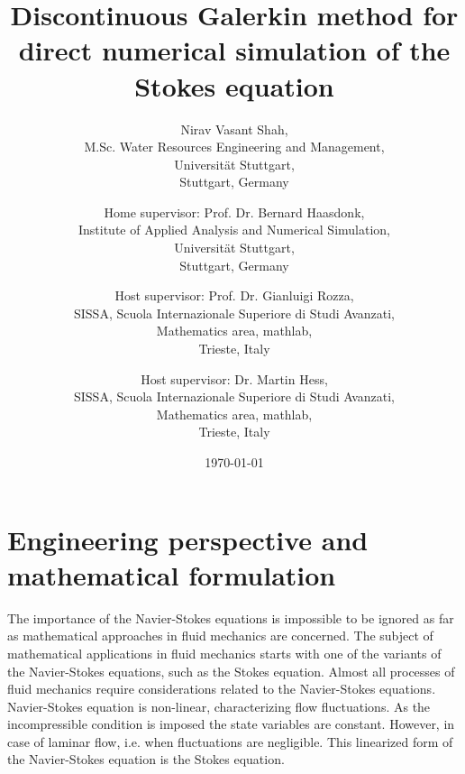 \documentclass[a4paper,oneside,openright,spanish,english]{book}
\begin{document}
\graphicspath{{images/}}

\begin{titlepage}
\title{Discontinuous Galerkin method for direct numerical simulation of the Stokes equation}
\author{Nirav Vasant Shah, \\M.Sc. Water Resources Engineering and Management, \\Universit\"at Stuttgart, \\Stuttgart, Germany\\ 
\and Home supervisor: Prof. Dr. Bernard Haasdonk,\\ Institute of Applied Analysis and Numerical Simulation, \\Universit\"at Stuttgart,\\ Stuttgart, Germany\\ \and Host supervisor: Prof. Dr. Gianluigi Rozza,\\ SISSA, Scuola Internazionale Superiore di Studi Avanzati, \\Mathematics area, mathlab, \\Trieste, Italy \\ \and Host supervisor: Dr. Martin Hess,\\ SISSA, Scuola Internazionale Superiore di Studi Avanzati, \\Mathematics area, mathlab,  \\Trieste, Italy }
\date{\today}
\maketitle

\end{titlepage}

\tableofcontents
\newpage

\chapter[Perspective and formulation]{Engineering perspective and mathematical formulation} 

The importance of the Navier-Stokes equations is impossible to be ignored as far as mathematical approaches in fluid mechanics are concerned. The subject of mathematical applications in fluid mechanics starts with  one of the variants of the Navier-Stokes equations, such as the Stokes equation. Almost all processes of fluid mechanics require considerations related to the Navier-Stokes equations. Navier-Stokes equation is non-linear, characterizing flow fluctuations. As the incompressible condition is imposed the state variables are constant. However, in case of laminar flow, i.e. when fluctuations are negligible. This linearized form of the Navier-Stokes equation is the Stokes equation.
\end{document}
